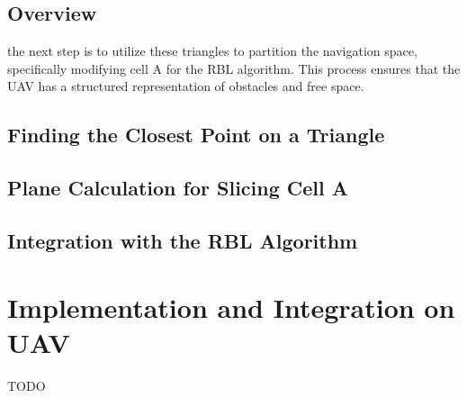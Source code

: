         \subsection{Overview}
        the next step is to utilize these triangles to partition the navigation space, specifically modifying cell 
        A for the RBL algorithm. This process ensures that the UAV has a structured representation of obstacles and free space.
        \subsection{Finding the Closest Point on a Triangle}
        \subsection{Plane Calculation for Slicing Cell A}
        \subsection{Integration with the RBL Algorithm}

    \section{Implementation and Integration on UAV}
        TODO
